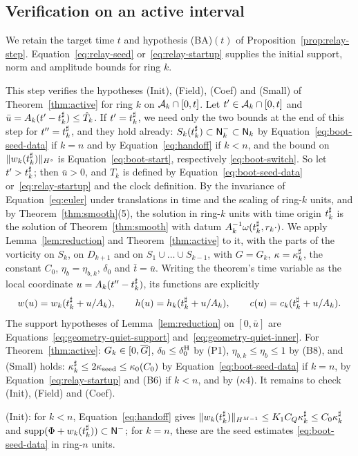 \subsection{Verification on an active interval}
\label{sec:bootstrap-active-checks}

We retain the target time $t$ and hypothesis (BA)$(t)$ of
Proposition~\ref{prop:relay-step}. Equation~\eqref{eq:relay-seed} or~\eqref{eq:relay-startup} supplies
the initial support, norm and amplitude bounds for ring $k$.

This step verifies the hypotheses
(Init), (Field), (Coef) and (Small) of Theorem~\ref{thm:active} for ring $k$ on
$\mathcal{A}_k\cap[0,t]$. Let $t'\in\mathcal{A}_k\cap[0,t]$ and
$\bar u=A_k(t'-t^\sharp_k)\le\hat T_k$. If $t'=t^\sharp_k$, we need only the two bounds
at the end of this step for $t''=t^\sharp_k$, and they hold already: $S_k(t^\sharp_k)\subset\mathsf{N}^{-}_k\subset\mathsf{N}_k$ by Equation~\eqref{eq:boot-seed-data}
if $k=n$ and by Equation~\eqref{eq:handoff} if $k<n$, and the bound on
$\|w_k(t^\sharp_k)\|_{H^s}$ is Equation~\eqref{eq:boot-start}, respectively
\eqref{eq:boot-switch}. So let $t'>t^\sharp_k$; then $\bar u>0$, and $T_k$ is defined
by Equation~\eqref{eq:boot-seed-data} or~\eqref{eq:relay-startup} and the clock definition. By the invariance of Equation~\eqref{eq:euler} under
translations in time and the scaling of ring-$k$ units, and by
Theorem~\ref{thm:smooth}(5), the solution in ring-$k$ units with time origin
$t^\sharp_k$ is the solution of Theorem~\ref{thm:smooth} with datum
$A_k^{-1}\omega(t^\sharp_k,r_k\cdot)$. We apply Lemma~\ref{lem:reduction} and
Theorem~\ref{thm:active} to it, with the parts of the vorticity on $S_k$, on
$D_{k+1}$ and on $S_1\cup\dots\cup S_{k-1}$, with $G=G_k$, $\kappa=\kappa^\sharp_k$, the
constant $C_0$, $\eta_b=\eta_{b,k}$, $\delta_0$ and $\bar t=\bar u$.
Writing the theorem's time variable as the local coordinate
$u=A_k(t''-t^\sharp_k)$, its functions are explicitly
\[
w(u)=w_k(t^\sharp_k+u/A_k),\qquad
h(u)=h_k(t^\sharp_k+u/A_k),\qquad
c(u)=c_k(t^\sharp_k+u/A_k).
\]
The support
hypotheses of Lemma~\ref{lem:reduction} on $[0,\bar u]$ are
Equations~\eqref{eq:geometry-quiet-support} and~\eqref{eq:geometry-quiet-inner}. For Theorem~\ref{thm:active}: $G_k\in[0,\overline{G}]$,
$\delta_0\le\delta_0^{\mathrm{H}}$ by (P1), $\eta_{b,k}\le\eta_b\le1$ by (B8), and (Small)
holds: $\kappa^\sharp_k\le2\kappa_{\mathrm{seed}}\le\kappa_0(C_0)$ by Equation~\eqref{eq:boot-seed-data} if $k=n$, by Equation~\eqref{eq:relay-startup} and (B6) if
$k<n$, and by ($\kappa$4). It remains to check (Init), (Field) and (Coef).

(Init): for $k<n$, Equation~\eqref{eq:handoff} gives
$\|w_k(t^\sharp_k)\|_{H^{M-1}}\le K_1C_Q\kappa^\sharp_k\le C_0\kappa^\sharp_k$ and
$\operatorname{supp}(\Phi+w_k(t^\sharp_k))\subset\mathsf{N}^{-}$; for $k=n$, these are the seed estimates
\eqref{eq:boot-seed-data} in ring-$n$ units.

